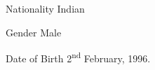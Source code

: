 


\begin{cvskills}


\cvskill
{Nationality} %
{Indian} %


\cvskill
{Gender} %
{Male} %


\cvskill
{Date of Birth} %
{2\textsuperscript{nd} February, 1996.} %


\end{cvskills}
\vspace{-.65\baselineskip} 